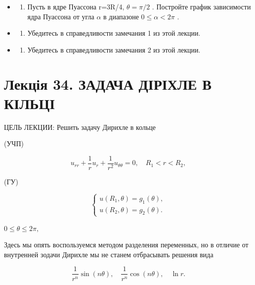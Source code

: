 \documentclass[
  ukrainian,
]{article}
\providecommand{\tightlist}{%
  \setlength{\itemsep}{0pt}\setlength{\parskip}{0pt}}
\begin{document}
\begin{itemize}
\tightlist
\item
  \begin{enumerate}
  \def\labelenumi{\arabic{enumi}.}
  \setcounter{enumi}{5}
  \tightlist
  \item
    Пусть в ядре Пуассона r=3R/4, \(\theta=\pi/2\) . Постройте график
    зависимости ядра Пуассона от угла \(\alpha\) в диапазоне
    \(0 \le \alpha < 2\pi\) .
  \end{enumerate}
\item
  \begin{enumerate}
  \def\labelenumi{\arabic{enumi}.}
  \setcounter{enumi}{6}
  \tightlist
  \item
    Убедитесь в справедливости замечания 1 из этой лекции.
  \end{enumerate}
\item
  \begin{enumerate}
  \def\labelenumi{\arabic{enumi}.}
  \setcounter{enumi}{7}
  \tightlist
  \item
    Убедитесь в справедливости замечания 2 из этой лекции.
  \end{enumerate}
\end{itemize}

\section{Лекція 34. ЗАДАЧА ДІРІХЛЕ В
КІЛЬЦІ}\label{ux43bux435ux43aux446ux456ux44f-34.-ux437ux430ux434ux430ux447ux430-ux434ux456ux440ux456ux445ux43bux435-ux432-ux43aux456ux43bux44cux446ux456}

ЦЕЛЬ ЛЕКЦИИ: Решить задачу Дирихле в кольце

(УЧП)

\[
u_{rr} + \frac{1}{r} u_r + \frac{1}{r^2} u_{\theta\theta} = 0, \quad R_1 < r < R_2,
\]

(ГУ)

\[
\begin{cases} u(R_1, \theta) = g_1(\theta), \\ u(R_2, \theta) = g_2(\theta). \end{cases}
\]

\(0 \le \theta \le 2\pi,\)

Здесь мы опять воспользуемся методом разделения переменных, но в отличие
от внутренней зодачи Дирихле мы не станем отбрасывать решения вида

\[
\frac{1}{r^n}\sin{(n\theta)}, \quad \frac{1}{r^n}\cos{(n\theta)}, \quad \ln r.
\]
\end{document}

